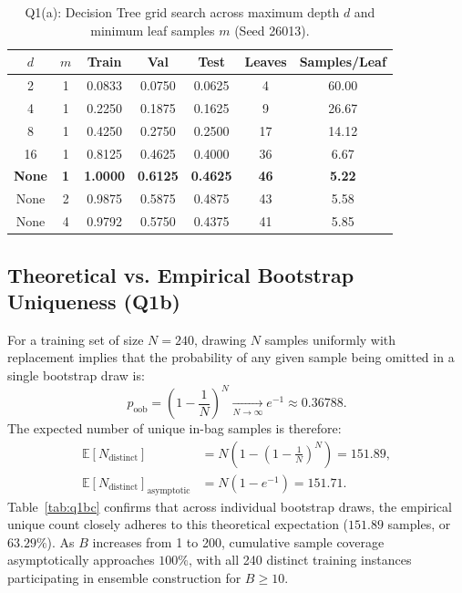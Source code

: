 \documentclass[10pt,twocolumn,letterpaper]{article}
\begin{document}
\begin{table}[t]
\centering
\small
\caption{Q1(a): Decision Tree grid search across maximum depth $d$ and minimum leaf samples $m$ (Seed 26013).}
\label{tab:q1a}
\begin{tabular}{ccccccc}
\toprule
$d$ & $m$ & Train & Val & Test & Leaves & Samples/Leaf \\
\midrule
2 & 1 & 0.0833 & 0.0750 & 0.0625 & 4 & 60.00 \\
4 & 1 & 0.2250 & 0.1875 & 0.1625 & 9 & 26.67 \\
8 & 1 & 0.4250 & 0.2750 & 0.2500 & 17 & 14.12 \\
16 & 1 & 0.8125 & 0.4625 & 0.4000 & 36 & 6.67 \\
\textbf{None} & \textbf{1} & \textbf{1.0000} & \textbf{0.6125} & \textbf{0.4625} & \textbf{46} & \textbf{5.22} \\
None & 2 & 0.9875 & 0.5875 & 0.4875 & 43 & 5.58 \\
None & 4 & 0.9792 & 0.5750 & 0.4375 & 41 & 5.85 \\
\bottomrule
\end{tabular}
\end{table}

\subsection{Theoretical vs. Empirical Bootstrap Uniqueness (Q1b)}
For a training set of size $N=240$, drawing $N$ samples uniformly with replacement implies that the probability of any given sample being omitted in a single bootstrap draw is:
\begin{equation}
    p_{\text{oob}} = \left(1 - \frac{1}{N}\right)^N \xrightarrow[N \to \infty]{} e^{-1} \approx 0.36788.
\end{equation}
The expected number of unique in-bag samples is therefore:
\begin{align}
    \mathbb{E}[N_{\text{distinct}}] &= N \left(1 - \left(1 - \frac{1}{N}\right)^N\right) = 151.89, \\
    \mathbb{E}[N_{\text{distinct}}]_{\text{asymptotic}} &= N (1 - e^{-1}) = 151.71.
\end{align}
Table~\ref{tab:q1bc} confirms that across individual bootstrap draws, the empirical unique count closely adheres to this theoretical expectation ($151.89$ samples, or $63.29\%$). As $B$ increases from 1 to 200, cumulative sample coverage asymptotically approaches $100\%$, with all 240 distinct training instances participating in ensemble construction for $B \ge 10$.
\end{document}
